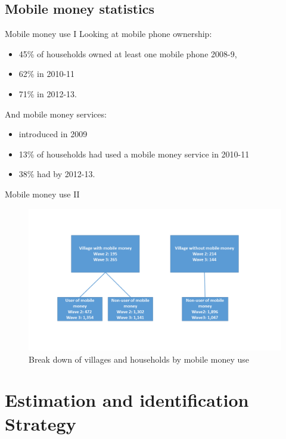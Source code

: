 \documentclass[t]{beamer}
\begin{document}
\subsection*{Mobile money statistics}
\begin{frame}{Mobile money use I}
Looking at mobile phone ownership: 
\begin{itemize}
\item 45\% of households owned
at least one mobile phone 2008-9, 
\item 62\% in 2010-11
\item 71\% in 2012-13. 
\end{itemize}
And mobile money services:
\begin{itemize}
\item introduced in 2009
\item 13\% of households
had used a mobile money service in 2010-11 
\item 38\% had by 2012-13.
\end{itemize}
\end{frame}
\begin{frame}{Mobile money use II}
\begin{figure}[label=MM chart]
\centering
\vspace{20pt}
\includegraphics[width=\textwidth,trim= 0 3cm 0 3cm, clip=true, keepaspectratio]{users_chart_} 
\caption{Break down of villages and households by mobile money use} \label{fig:users chart}
\end{figure}
\end{frame}

\section{Estimation and identification Strategy}
\end{document}
